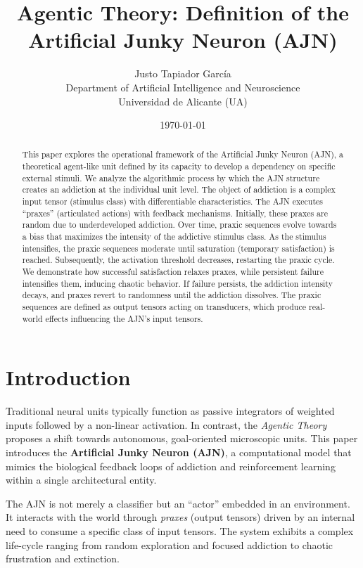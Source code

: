 \documentclass[12pt,a4paper]{article}
\title{\textbf{Agentic Theory: Definition of the Artificial Junky Neuron (AJN)}}
\author{Justo Tapiador García \\ Department of Artificial Intelligence and Neuroscience \\ Universidad de Alicante (UA)}
\date{\today}
\begin{document}
\maketitle

\begin{abstract}
This paper explores the operational framework of the Artificial Junky Neuron (AJN), a theoretical agent-like unit defined by its capacity to develop a dependency on specific external stimuli. We analyze the algorithmic process by which the AJN structure creates an addiction at the individual unit level. The object of addiction is a complex input tensor (stimulus class) with differentiable characteristics. The AJN executes ``praxes'' (articulated actions) with feedback mechanisms. Initially, these praxes are random due to underdeveloped addiction. Over time, praxic sequences evolve towards a bias that maximizes the intensity of the addictive stimulus class. As the stimulus intensifies, the praxic sequences moderate until saturation (temporary satisfaction) is reached. Subsequently, the activation threshold decreases, restarting the praxic cycle. We demonstrate how successful satisfaction relaxes praxes, while persistent failure intensifies them, inducing chaotic behavior. If failure persists, the addiction intensity decays, and praxes revert to randomness until the addiction dissolves. The praxic sequences are defined as output tensors acting on transducers, which produce real-world effects influencing the AJN's input tensors.
\end{abstract}

\section{Introduction}

Traditional neural units typically function as passive integrators of weighted inputs followed by a non-linear activation. In contrast, the \textit{Agentic Theory} proposes a shift towards autonomous, goal-oriented microscopic units. This paper introduces the \textbf{Artificial Junky Neuron (AJN)}, a computational model that mimics the biological feedback loops of addiction and reinforcement learning within a single architectural entity.

The AJN is not merely a classifier but an ``actor'' embedded in an environment. It interacts with the world through \textit{praxes} (output tensors) driven by an internal need to consume a specific class of input tensors. The system exhibits a complex life-cycle ranging from random exploration and focused addiction to chaotic frustration and extinction.
\end{document}
